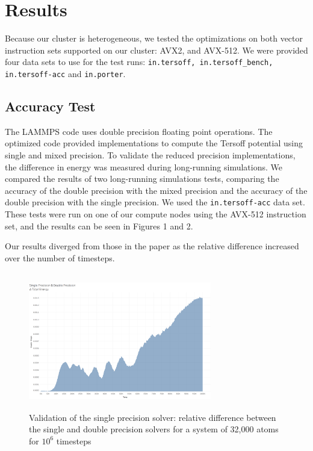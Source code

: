 \documentclass{sig-alternate-05-2015}
\begin{document}
\section{Results}
Because our cluster is heterogeneous, we tested the optimizations on both vector instruction sets supported on our cluster:  AVX2, and AVX-512. We were provided four data sets to use for the test runs:  \texttt{in.tersoff, in.tersoff\_bench, in.tersoff-acc} and \texttt{in.porter}. 

\subsection{Accuracy Test}
The LAMMPS code uses double precision floating point operations.  The optimized code provided implementations to compute the Tersoff potential using single and mixed precision. To validate the reduced precision implementations, the difference in energy was measured during long-running simulations.  We compared the results of two long-running simulations tests, comparing the accuracy of the double precision with the mixed precision and the accuracy of the double precision with the single precision.  We used the \texttt{in.tersoff-acc} data set.  These tests were run on one of our compute nodes using the AVX-512 instruction set, and the results can be seen in Figures 1 and 2.   

Our results diverged from those in the paper as the relative difference increased over the number of timesteps.  

\begin{figure}
\centering
\includegraphics[height=6cm, width=8cm]{Single-Double.png}
\caption{Validation of the single precision solver: relative difference between the single and double precision solvers for a system of 32,000 atoms for $10^{6}$ timesteps}
\vskip -6pt
\end{figure}
\end{document}
